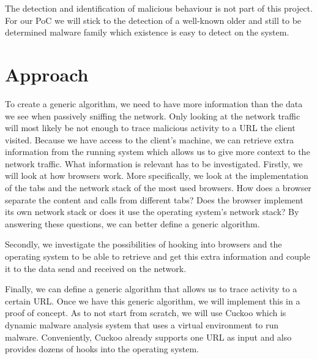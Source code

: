 \documentclass{scrartcl}
\begin{document}
The detection and identification of malicious behaviour is not part of this project. For our PoC we will stick to the detection of a well-known older and still to be determined malware family which existence is easy to detect on the system. 



\section{Approach}

To create a generic algorithm, we need to have more information than the data we see when passively sniffing the network. Only looking at the network traffic will most likely be not enough to trace malicious activity to a URL the client visited. Because we have access to the client's machine, we can retrieve extra information from the running system which allows us to give more context to the network traffic. What information is relevant has to be investigated. Firstly, we will look at how browsers work. More specifically, we look at the implementation of the tabs and the network stack of the most used browsers. How does a browser separate the content and calls from different tabs? Does the browser implement its own network stack or does it use the operating system's network stack? By answering these questions, we can better define a generic algorithm.

Secondly, we investigate the possibilities of hooking into browsers and the operating system to be able to retrieve and get this extra information and couple it to the data send and received on the network.

Finally, we can define a generic algorithm that allows us to trace activity to a certain URL. Once we have this generic algorithm, we will implement this in a proof of concept. As to not start from scratch, we will use Cuckoo which is dynamic malware analysis system that uses a virtual environment to run malware. Conveniently, Cuckoo already supports one URL as input and also provides dozens of hooks into the operating system. 
\end{document}
